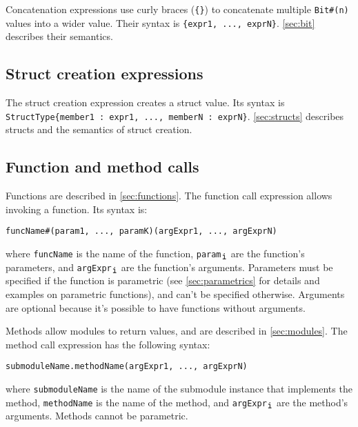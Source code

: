 Concatenation expressions use curly braces (\verb|{}|) to concatenate multiple \verb|Bit#(n)| values into a wider value.
Their syntax is \verb|{expr1, ..., exprN}|.
\autoref{sec:bit} describes their semantics.

\subsection{Struct creation expressions}
\label{sec:structExpr}

The struct creation expression creates a struct value. Its syntax is
\texttt{StructType\{member1\,:\,expr1, ..., memberN\,:\,exprN\}}.
\autoref{sec:structs} describes structs and the semantics of struct creation.

\subsection{Function and method calls}
\label{sec:calls}

Functions are described in \autoref{sec:functions}. The function call expression allows invoking a function. Its syntax is:
\begin{center}
  \verb|funcName|\tmp{$[$}\verb|#(param1, ..., paramK)|\tmp{$]$}\tmp{$[$}\verb|(argExpr1, ..., argExprN)|\tmp{$]$}
\end{center}
where \verb|funcName| is the name of the function, \verb|param|$_{\verb|i|}$ are the function's parameters,
and \verb|argExpr|$_{\verb|i|}$ are the function's arguments.
Parameters must be specified if the function is parametric (see \autoref{sec:parametrics} for details and examples on parametric functions),
and can't be specified otherwise.
Arguments are optional because it's possible to have functions without arguments. 

Methods allow modules to return values, and are described in \autoref{sec:modules}. The method call expression has the following syntax:
\begin{center}
    \verb|submoduleName.methodName|\tmp{$[$}\verb|(argExpr1, ..., argExprN)|\tmp{$]$}
\end{center}
where \verb|submoduleName| is the name of the submodule instance that implements the method,
\verb|methodName| is the name of the method, and \verb|argExpr|$_{\verb|i|}$ are the method's arguments.
Methods cannot be parametric.
